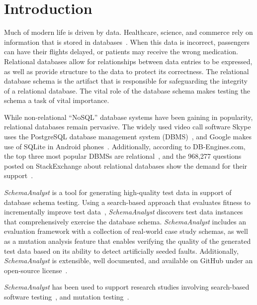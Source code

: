 \section{Introduction}\label{sec:intro}

Much of modern life is driven by data.  Healthcare, science, and commerce rely on information that is
stored in databases~\cite{kapfhammer2007comprehensive}.  When this data is incorrect, passengers can have
their flights delayed, or patients may receive the wrong medication. 
Relational databases allow for relationships between data entries to be expressed, as well as provide structure to 
the data to protect its correctness. The relational database schema is the artifact
that is responsible for safeguarding the integrity of a relational database. The vital role of the database
schema makes testing the schema a task of vital importance.

While non-relational ``NoSQL'' database systems have been gaining in popularity, relational databases remain
pervasive. The widely used video call software Skype uses the PostgreSQL database management system
(DBMS)~\cite{https://www.postgresql.org/about/users/},
and Google makes use of SQLite in Android phones~\cite{https://www.sqlite.org/famous.html}.
Additionally, according to DB-Engines.com, the top three most popular DBMSs are 
relational~\cite{http://db-engines.com/en/ranking}, and the 968,277 questions posted on StackExchange 
about relational databases show the demand for their support~\cite{http://goo.gl/F3Tiax}.

\textit{SchemaAnalyst} is a tool for generating high-quality test data in support of database schema
testing. Using a search-based approach that evaluates fitness to incrementally improve test data~\cite{Korel:AVM},
\textit{SchemaAnalyst} discovers test data instances that comprehensively exercise the database schema.
\textit{SchemaAnalyst} includes an evaluation framework
with a collection of real-world case study schemas, as well as a mutation analysis feature
that enables verifying the quality of the generated test data based on its ability to detect artificially
seeded faults. Additionally, \textit{SchemaAnalyst}
is extensible, well documented, and available on GitHub under an open-source license~\cite{tool}.

\textit{SchemaAnalyst} has been used to support research studies involving search-based
software testing~\cite{kapfhammer2013search,mcminn2015effectiveness,kinneer2015automatically}, and
mutation testing~\cite{wright2013efficient,wright2014impact,wright2015mutation}.

